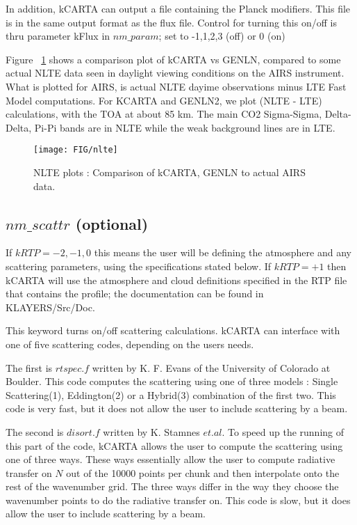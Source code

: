 \documentclass[12pt]{article}
\newcommand{\kc}{\textsf{kCARTA}\xspace}
\begin{document}
{{\begin{verbatim}
\end{verbatim}

In addition, \kc can output a file containing the Planck modifiers. This file 
is in the same output format as the flux file. Control for turning this 
on/off is thru parameter kFlux in $nm\_param$; set to -1,1,2,3 (off) or 0 (on)

Figure ~\ref{nlte} shows a comparison plot of kCARTA vs GENLN, compared to some
actual NLTE data seen in daylight viewing conditions on the AIRS instrument.
What is plotted for AIRS, is actual NLTE dayime observations minus LTE Fast 
Model computations. For KCARTA and GENLN2, we plot (NLTE - LTE) calculations,
with the TOA at about 85 km. The main CO2 Sigma-Sigma, Delta-Delta, Pi-Pi 
bands are in NLTE while the weak background lines are in LTE. 

\begin{figure}
\texttt{[image: FIG/nlte]}
\caption{NLTE plots : Comparison of kCARTA, GENLN to actual AIRS data.}
\label{nlte}
\end{figure}

\subsection{$nm\_scattr$ (optional)}

If $kRTP = -2,-1,0$ this means the user will be defining the atmosphere and
any scattering parameters, using the specifications stated below. If 
$kRTP = +1$ then \kc will use the atmosphere and cloud definitions specified 
in the RTP file that contains the profile; the documentation can be found in 
KLAYERS/Src/Doc. 

This keyword turns on/off scattering calculations.  \kc can interface with 
one of five scattering codes, depending on the users needs. 

The first is $rtspec.f$ written by K. F. Evans of the University of Colorado 
at Boulder. This code computes the scattering using one of three  models : 
Single Scattering(1), Eddington(2) or a Hybrid(3) combination of the 
first two. This code is very fast, but it does not allow the user to include
scattering by a beam.

The second is $disort.f$ written by K. Stamnes $et. al.$ To speed up the 
running of this part
of the code, \kc allows the user to compute the scattering using one of three 
ways. These ways essentially allow the user to compute radiative transfer on 
$N$ out of the 10000 points per chunk and then interpolate onto the rest of 
the wavenumber grid. The three ways differ in the way they choose the 
wavenumber points to do the radiative transfer on. This code is slow, but 
it does allow the user to include scattering by a beam.

}}
\end{document}
